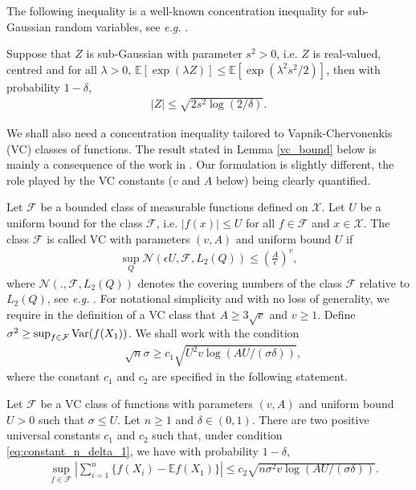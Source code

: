 The following inequality is a well-known concentration inequality for sub-Gaussian random variables, see \textit{e.g.} \citep{boucheronConcentrationInequalitiesNonasymptotic2013}.

\begin{lemma}\label{lemma:SG}
Suppose that $Z$ is sub-Gaussian with parameter $s^2>0$, i.e. $Z$ is real-valued, centred and for all $\lambda>0$, $\mathbb E [ \exp(\lambda Z)  ] \leq \mathbb E [ \exp( \lambda^2 s^2 / 2)]$, then with probability $1-\delta$,
\begin{align*}
|Z|  \leq \sqrt {  2s ^2 \log( 2 / \delta) } .  
\end{align*} 
\end{lemma}

We shall also need a concentration inequality tailored to Vapnik-Chervonenkis (VC) classes of functions. The result stated in Lemma \ref{vc_bound} below is mainly a consequence of the work in \cite{gineConsistencyKernelDensity2001}. Our formulation is slightly different, the role played by the VC constants ($v$ and $A$ below) being clearly quantified. 

Let $\mathcal F$ be a bounded class of measurable functions defined on $\mathcal X$. Let $U$ be a uniform bound for the class $\mathcal F$, i.e. $|f(x)| \leq U$ for all $f\in \mathcal F$ and $x\in \mathcal X$. The class $\mathcal F$ is called VC with parameters $(v ,A)$ and uniform bound $U$ if
\begin{align*}
\sup_Q\mathcal N  \left( \epsilon U , \mathcal F , L_2 (Q)  \right)\leq  \left( \frac A \epsilon \right)  ^{v }  ,
\end{align*}
where $\mathcal N (.,\mathcal{F},L_2(Q))$ denotes the covering numbers of the class $\mathcal{F}$ relative to $L_2(Q)$, see \textit{e.g.} \citep{vandervaartWeakConvergenceEmpirical1996a}.  For notational simplicity and with no loss of generality, we require in the definition of a VC class that $A\geq 3\sqrt e$ and $v\geq 1$. Define 
 $\sigma^2 \geq \sup_{f\in \mathcal F} \operatorname{Var}(f (X_1) )$. We shall work with the condition
\begin{align}
\label{eq:constant_n_delta_1}  &\sqrt n \sigma \geq c_1  \sqrt {U^2 v\log(AU / (\sigma \delta)) },
\end{align} 
where the constant $c_1$ and $c_2$ are specified in the following statement.
\begin{lemma}\label{vc_bound}
Let $\mathcal F$ be a VC class of functions with parameters $(v,A)$ and uniform bound $U>0$ such that $\sigma \leq U$.  Let $n\geq 1$ and $\delta\in (0,1) $. There are two positive universal constants $c_1$ and $c_2$ such that, under condition \eqref{eq:constant_n_delta_1}, we have with probability $1-\delta$,
\begin{align*}
&  \sup_{f\in \mathcal F} \left| \sum_{i=1} ^n \{ f(X_i) - \mathbb E f(X_1) \}\right|   \leq c_2 \sqrt { n\sigma^2 v \log( A U / (\sigma \delta) ) }   .
  \end{align*} 
\end{lemma}

